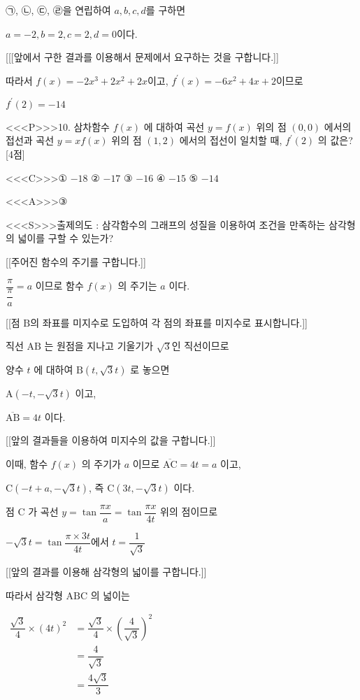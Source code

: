 \documentclass{oblivoir}
\begin{document}
㉠, ㉡, ㉢, ㉣을 연립하여 $a,b,c,d$를 구하면

$a=-2, b=2, c=2, d=0$이다.

[[[앞에서 구한 결과를 이용해서 문제에서 요구하는 것을 구합니다.]]

따라서 $f(x)=-2 x^{3}+2 x^{2}+2 x$이고, $f^{\prime}(x)=-6 x^{2}+4 x+2$이므로

$f^{\prime}(2)=-14$


<<<P>>>10. 삼차함수 $f(x)$ 에 대하여 곡선 $y=f(x)$ 위의 점 $(0,0)$ 에서의 접선과 곡선 $y=x f(x)$ 위의 점 $(1,2)$ 에서의 접선이 일치할 때, $f^{\prime}(2)$ 의 값은? [4점]

<<<C>>>① $-18$
② $-17$
③ $-16$
④ $-15$
⑤ $-14$


<<<A>>>③

<<<S>>>출제의도 : 삼각함수의 그래프의 성질을 이용하여 조건을 만족하는 삼각형의 넓이를 구할 수 있는가?

[[주어진 함수의 주기를 구합니다.]]

$\dfrac{\pi}{\dfrac{\pi}{a}}=a$ 이므로
함수 $f(x)$ 의 주기는 $a$ 이다.

[[점 $\mathrm{B}$의 좌표를 미지수로 도입하여 각 점의 좌표를 미지수로 표시합니다.]]

직선 $\mathrm{AB}$ 는 원점을 지나고 기울기가 $\sqrt{3}$인 직선이므로

양수 $t$ 에 대하여
$\mathrm{B}(t, \sqrt{3} t)$ 로 놓으면

$\mathrm{A}(-t,-\sqrt{3} t)$ 이고,

$\overline{\mathrm{AB}}=4 t$ 이다.

[[앞의 결과들을 이용하여 미지수의 값을 구합니다.]]

이때, 함수 $f(x)$ 의 주기가 $a$ 이므로
$\overline{\mathrm{AC}}=4 t=a$ 이고,

$\mathrm{C}(-t+a,-\sqrt{3} t)$, 즉 $\mathrm{C}(3 t,-\sqrt{3} t)$ 이다.

점 $\mathrm{C}$ 가 곡선 $y=\tan \dfrac{\pi x}{a}=\tan \dfrac{\pi x}{4 t}$ 위의 점이므로

$-\sqrt{3} t=\tan \dfrac{\pi \times 3 t}{4 t}$에서 $t=\dfrac{1}{\sqrt{3}}$

[[앞의 결과를 이용해 삼각형의 넓이를 구합니다.]]

따라서 삼각형 $\mathrm{ABC}$ 의 넓이는

$
\begin{aligned}
\dfrac{\sqrt{3}}{4} \times(4 t)^{2} &=\dfrac{\sqrt{3}}{4} \times\left(\dfrac{4}{\sqrt{3}}\right)^{2} \\
&=\dfrac{4}{\sqrt{3}} \\
&=\dfrac{4 \sqrt{3}}{3}
\end{aligned}
$
\end{document}
